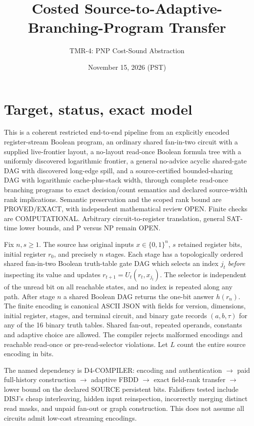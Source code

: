 \documentclass[11pt]{article}
\title{Costed Source-to-Adaptive-Branching-Program Transfer}
\author{TMR-4: PNP Cost-Sound Abstraction}
\date{November 15, 2026 (PST)}
\begin{document}
\maketitle
\section{Target, status, exact model}
This is a coherent restricted end-to-end pipeline from an explicitly encoded register-stream Boolean program, an ordinary shared fan-in-two circuit with a supplied live-frontier layout, a no-layout read-once Boolean formula tree with a uniformly discovered logarithmic frontier, a general no-advice acyclic shared-gate DAG with discovered long-edge spill, and a source-certified bounded-sharing DAG with logarithmic cache-plus-stack width, through complete read-once branching programs to exact decision/count semantics and declared source-width rank implications. Semantic preservation and the scoped rank bound are PROVED/EXACT, with independent mathematical review OPEN. Finite checks are COMPUTATIONAL. Arbitrary circuit-to-register translation, general SAT-time lower bounds, and P versus NP remain OPEN.

Fix $n,s\geq1$. The source has original inputs $x\in\{0,1\}^n$, $s$ retained register bits, initial register $r_0$, and precisely $n$ stages. Each stage has a topologically ordered shared fan-in-two Boolean truth-table gate DAG which selects an index $j_t$ \emph{before} inspecting its value and updates $r_{t+1}=U_t(r_t,x_{j_t})$. The selector is independent of the unread bit on all reachable states, and no index is repeated along any path. After stage $n$ a shared Boolean DAG returns the one-bit answer $h(r_n)$. The finite encoding is canonical ASCII JSON with fields for version, dimensions, initial register, stages, and terminal circuit, and binary gate records $(a,b,\tau)$ for any of the 16 binary truth tables. Shared fan-out, repeated operands, constants and adaptive choice are allowed. The compiler rejects malformed encodings and reachable read-once or pre-read-selector violations. Let $L$ count the entire source encoding in bits.

The named dependency is D4-COMPILER: encoding and authentication $\longrightarrow$ paid full-history construction $\longrightarrow$ adaptive FBDD $\longrightarrow$ exact field-rank transfer $\longrightarrow$ lower bound on the declared SOURCE persistent bits. Falsifiers tested include DISJ's cheap interleaving, hidden input reinspection, incorrectly merging distinct read masks, and unpaid fan-out or graph construction. This does not assume all circuits admit low-cost streaming encodings.
\end{document}
